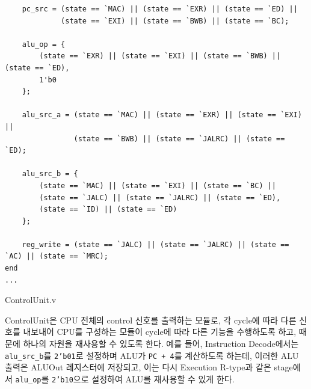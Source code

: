 \documentclass[openright, a4paper]{article}
\newenvironment{longlisting}{\captionsetup{type=listing}}{}
\newcommand{\code}[1]{\texttt{#1}}
\begin{document}
\begin{longlisting}
\begin{verbatim}
    pc_src = (state == `MAC) || (state == `EXR) || (state == `ED) ||
             (state == `EXI) || (state == `BWB) || (state == `BC);

    alu_op = {
        (state == `EXR) || (state == `EXI) || (state == `BWB) || (state == `ED),
        1'b0
    };

    alu_src_a = (state == `MAC) || (state == `EXR) || (state == `EXI) ||
                (state == `BWB) || (state == `JALRC) || (state == `ED);

    alu_src_b = {
        (state == `MAC) || (state == `EXI) || (state == `BC) || 
        (state == `JALC) || (state == `JALRC) || (state == `ED),
        (state == `ID) || (state == `ED)
    };

    reg_write = (state == `JALC) || (state == `JALRC) || (state == `AC) || (state == `MRC);
end
...
    \end{verbatim}
    \caption{ControlUnit.v}
\end{longlisting}
\break

ControlUnit은 CPU 전체의 control 신호를 출력하는 모듈로, 각 cycle에 따라 다른
신호를 내보내어 CPU를 구성하는 모듈이 cycle에 따라 다른 기능을 수행하도록 하고, 
때문에 하나의 자원을 재사용할 수 있도록 한다. 예를 들어, Instruction 
Decode에서는 \code{alu_src_b}를 \code{2'b01}로 설정하며 ALU가 \code{PC + 4}를
계산하도록 하는데, 이러한 ALU 출력은 ALUOut 레지스터에 저장되고, 이는 다시
Execution R-type과 같은 stage에서 \code{alu_op}를 \code{2'b10}으로 설정하여
ALU를 재사용할 수 있게 한다.
\end{document}
